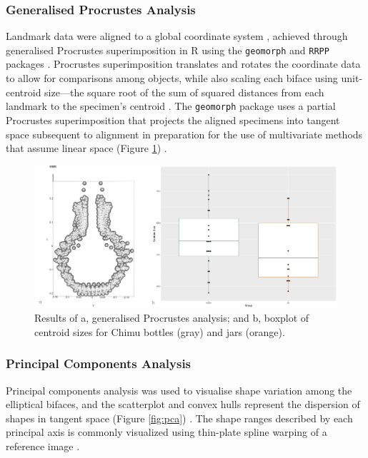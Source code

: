 \documentclass[]{interact}
\theoremstyle{plain}%
\theoremstyle{definition}
\theoremstyle{remark}
\begin{document}
\hypertarget{generalised-procrustes-analysis}{%
\subsubsection{Generalised Procrustes
Analysis}\label{generalised-procrustes-analysis}}

Landmark data were aligned to a global coordinate system
\citep{RN8477,RN7502,RN11622,RN11623,RN11563}, achieved through
generalised Procrustes superimposition \citep{RN11138,RN478,RN1646} in R
using the \texttt{geomorph} and \texttt{RRPP} packages
\citep{RN1655,RN11775,RN11530,RN1774,RN9565}. Procrustes superimposition
translates and rotates the coordinate data to allow for comparisons
among objects, while also scaling each biface using unit-centroid
size---the square root of the sum of squared distances from each
landmark to the specimen's centroid
\citep{RN11139,RN11140,RN5622,RN478}. The \texttt{geomorph} package uses
a partial Procrustes superimposition that projects the aligned specimens
into tangent space subsequent to alignment in preparation for the use of
multivariate methods that assume linear space (Figure \ref{fig:gpa})
\citep{RN11141,RN11142,RN1646,RN11563}.

\begin{figure}\centering
\includegraphics[width=\linewidth]{figs/gpa.csize.png}
\caption{Results of a, generalised Procrustes analysis; and b, boxplot of centroid sizes for Chimu bottles (gray) and jars (orange).}
\label{fig:gpa}
\end{figure}

\hypertarget{principal-components-analysis}{%
\subsubsection{Principal Components
Analysis}\label{principal-components-analysis}}

Principal components analysis \citep{RN1746} was used to visualise shape
variation among the elliptical bifaces, and the scatterplot and convex
hulls represent the dispersion of shapes in tangent space (Figure
\ref{fig:pca}) \citep{RN8633,RN5616,RN11143,RN7550}. The shape ranges
described by each principal axis is commonly visualized using thin-plate
spline warping of a reference image \citep{RN1731,RN479}.
\end{document}
